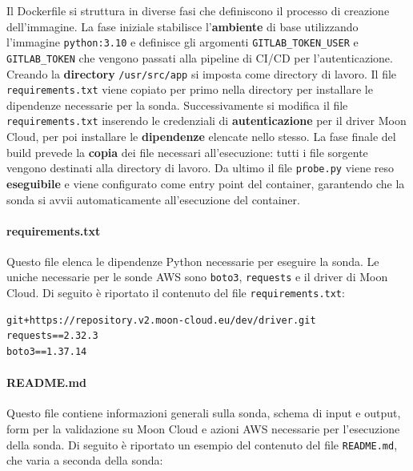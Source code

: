 Il Dockerfile si struttura in diverse fasi che definiscono il processo di creazione dell'immagine. La fase iniziale stabilisce l'\textbf{ambiente} di base utilizzando l'immagine \texttt{python:3.10} e definisce gli argomenti \texttt{GITLAB\_TOKEN\_USER} e \texttt{GITLAB\_TOKEN} che vengono passati alla pipeline di CI/CD per l'autenticazione.
Creando la \textbf{directory} \texttt{/usr/src/app} si imposta come directory di lavoro. Il file \texttt{requirements.txt} viene copiato per primo nella directory per installare le dipendenze necessarie per la sonda.
Successivamente si modifica il file \texttt{requirements.txt} inserendo le credenziali di \textbf{autenticazione} per il driver Moon Cloud, per poi installare le \textbf{dipendenze} elencate nello stesso.
La fase finale del build prevede la \textbf{copia} dei file necessari all'esecuzione: tutti i file sorgente vengono destinati alla directory di lavoro. Da ultimo il file \texttt{probe.py} viene reso \textbf{eseguibile} e viene configurato come entry point del container, garantendo che la sonda si avvii automaticamente all'esecuzione del container.

\paragraph{requirements.txt} Questo file elenca le dipendenze Python necessarie per eseguire la sonda. Le uniche necessarie per le sonde AWS sono \texttt{boto3}, \texttt{requests} e il driver di Moon Cloud. Di seguito è riportato il contenuto del file \texttt{requirements.txt}:

\begin{lstlisting}[caption ={File \texttt{requirements.txt} per le dipendenze della sonda}]
git+https://repository.v2.moon-cloud.eu/dev/driver.git
requests==2.32.3
boto3==1.37.14
\end{lstlisting}

\paragraph{README.md} Questo file contiene informazioni generali sulla sonda, schema di input e output, form per la validazione su Moon Cloud e azioni AWS necessarie per l'esecuzione della sonda. Di seguito è riportato un esempio del contenuto del file \texttt{README.md}, che varia a seconda della sonda:


